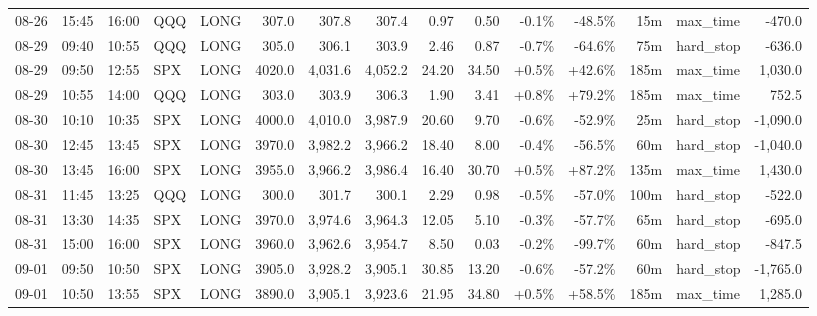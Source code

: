 \documentclass[11pt,a4paper,twoside]{article}
\begin{document}
\begin{landscape}
\begin{center}
\begin{longtable}{>{\color{txtmain}}l l l l l r r r r r r r r >{\color{txtmain}}l r}
08-26 & 15:45 & 16:00 & QQQ & LONG & 307.0 & 307.8 & 307.4 & 0.97 & 0.50 & \textcolor{lossred}{-0.1\%} & \textcolor{lossred}{-48.5\%} & 15m & max\_time & \textcolor{lossred}{-470.0} \\
08-29 & 09:40 & 10:55 & QQQ & LONG & 305.0 & 306.1 & 303.9 & 2.46 & 0.87 & \textcolor{lossred}{-0.7\%} & \textcolor{lossred}{-64.6\%} & 75m & hard\_stop & \textcolor{lossred}{-636.0} \\
08-29 & 09:50 & 12:55 & SPX & LONG & 4020.0 & 4,031.6 & 4,052.2 & 24.20 & 34.50 & \textcolor{wingreen}{+0.5\%} & \textcolor{wingreen}{+42.6\%} & 185m & max\_time & \textcolor{wingreen}{1,030.0} \\
08-29 & 10:55 & 14:00 & QQQ & LONG & 303.0 & 303.9 & 306.3 & 1.90 & 3.41 & \textcolor{wingreen}{+0.8\%} & \textcolor{wingreen}{+79.2\%} & 185m & max\_time & \textcolor{wingreen}{752.5} \\
08-30 & 10:10 & 10:35 & SPX & LONG & 4000.0 & 4,010.0 & 3,987.9 & 20.60 & 9.70 & \textcolor{lossred}{-0.6\%} & \textcolor{lossred}{-52.9\%} & 25m & hard\_stop & \textcolor{lossred}{-1,090.0} \\
08-30 & 12:45 & 13:45 & SPX & LONG & 3970.0 & 3,982.2 & 3,966.2 & 18.40 & 8.00 & \textcolor{lossred}{-0.4\%} & \textcolor{lossred}{-56.5\%} & 60m & hard\_stop & \textcolor{lossred}{-1,040.0} \\
08-30 & 13:45 & 16:00 & SPX & LONG & 3955.0 & 3,966.2 & 3,986.4 & 16.40 & 30.70 & \textcolor{wingreen}{+0.5\%} & \textcolor{wingreen}{+87.2\%} & 135m & max\_time & \textcolor{wingreen}{1,430.0} \\
08-31 & 11:45 & 13:25 & QQQ & LONG & 300.0 & 301.7 & 300.1 & 2.29 & 0.98 & \textcolor{lossred}{-0.5\%} & \textcolor{lossred}{-57.0\%} & 100m & hard\_stop & \textcolor{lossred}{-522.0} \\
08-31 & 13:30 & 14:35 & SPX & LONG & 3970.0 & 3,974.6 & 3,964.3 & 12.05 & 5.10 & \textcolor{lossred}{-0.3\%} & \textcolor{lossred}{-57.7\%} & 65m & hard\_stop & \textcolor{lossred}{-695.0} \\
08-31 & 15:00 & 16:00 & SPX & LONG & 3960.0 & 3,962.6 & 3,954.7 & 8.50 & 0.03 & \textcolor{lossred}{-0.2\%} & \textcolor{lossred}{-99.7\%} & 60m & hard\_stop & \textcolor{lossred}{-847.5} \\
09-01 & 09:50 & 10:50 & SPX & LONG & 3905.0 & 3,928.2 & 3,905.1 & 30.85 & 13.20 & \textcolor{lossred}{-0.6\%} & \textcolor{lossred}{-57.2\%} & 60m & hard\_stop & \textcolor{lossred}{-1,765.0} \\
09-01 & 10:50 & 13:55 & SPX & LONG & 3890.0 & 3,905.1 & 3,923.6 & 21.95 & 34.80 & \textcolor{wingreen}{+0.5\%} & \textcolor{wingreen}{+58.5\%} & 185m & max\_time & \textcolor{wingreen}{1,285.0} \\

\end{longtable}
\end{center}
\end{landscape}
\end{document}
